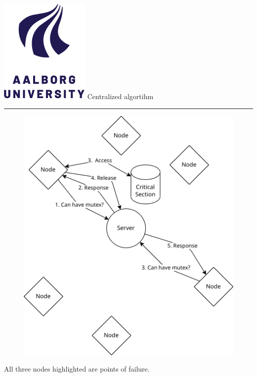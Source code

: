 \documentclass[aspectratio=1610,17pt,utf8]{beamer}
\newcommand{\regularframe}[1]{\color{black}\includegraphics[width=.05\textwidth]{figures/aau.png} #1\\\hrule}
\begin{document}
\begin{frame}{\regularframe{Centralized algortihm}}
    \begin{minipage}{.45\textwidth}
        \begin{figure}
            \includegraphics[width=\textwidth]{figures/1-mutex.png}
        \end{figure}
    \end{minipage}
    \begin{minipage}{.5\textwidth}
        \tiny{All three nodes highlighted are points of failure.}
    \end{minipage}
\end{frame}

\end{document}
